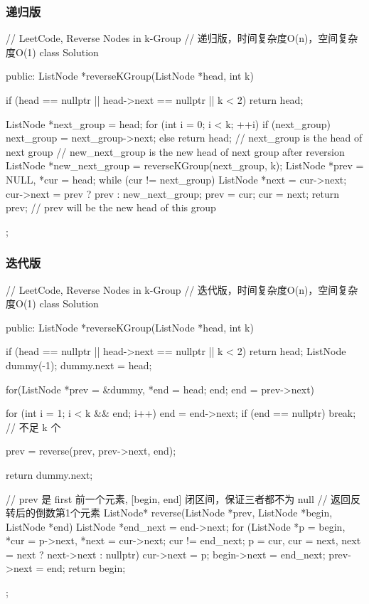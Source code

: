 \subsubsection{递归版}
\begin{Code}
// LeetCode, Reverse Nodes in k-Group
// 递归版，时间复杂度O(n)，空间复杂度O(1)
class Solution {
public:
    ListNode *reverseKGroup(ListNode *head, int k) {
        if (head == nullptr || head->next == nullptr || k < 2)
            return head;

        ListNode *next_group = head;
        for (int i = 0; i < k; ++i) {
            if (next_group)
                next_group = next_group->next;
            else
                return head;
        }
        // next_group is the head of next group
        // new_next_group is the new head of next group after reversion
        ListNode *new_next_group = reverseKGroup(next_group, k);
        ListNode *prev = NULL, *cur = head;
        while (cur != next_group) {
            ListNode *next = cur->next;
            cur->next = prev ? prev : new_next_group;
            prev = cur;
            cur = next;
        }
        return prev; // prev will be the new head of this group
    }
};
\end{Code}


\subsubsection{迭代版}
\begin{Code}
// LeetCode, Reverse Nodes in k-Group
// 迭代版，时间复杂度O(n)，空间复杂度O(1)
class Solution {
public:
    ListNode *reverseKGroup(ListNode *head, int k) {
        if (head == nullptr || head->next == nullptr || k < 2) return head;
        ListNode dummy(-1);
        dummy.next = head;

        for(ListNode *prev = &dummy, *end = head; end; end = prev->next) {
            for (int i = 1; i < k && end; i++)
                end = end->next;
            if (end  == nullptr) break;  // 不足 k 个

            prev = reverse(prev, prev->next, end);
        }

        return dummy.next;
    }

    // prev 是 first 前一个元素, [begin, end] 闭区间，保证三者都不为 null
    // 返回反转后的倒数第1个元素
    ListNode* reverse(ListNode *prev, ListNode *begin, ListNode *end) {
        ListNode *end_next = end->next;
        for (ListNode *p = begin, *cur = p->next, *next = cur->next;
                cur != end_next;
                p = cur, cur = next, next = next ? next->next : nullptr) {
            cur->next = p;
        }
        begin->next = end_next;
        prev->next = end;
        return begin;
    }
};
\end{Code}


